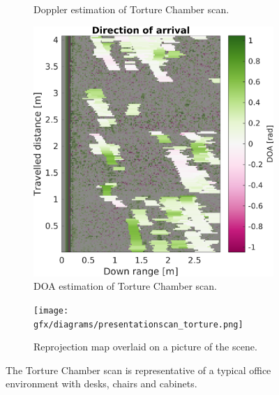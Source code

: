 \begin{figure}[htbp]
\begin{subfigure}[t]{.32\textwidth}
        \caption{Doppler estimation of Torture Chamber scan.}
        \label{fig:pres3-d}
    \end{subfigure}%
    \hfill%
    \begin{subfigure}[t]{.32\textwidth}
        \includegraphics[max width=\linewidth]{gfx/figures/t_doa.png}
        \caption{DOA estimation of Torture Chamber scan.}
        \label{fig:pres3-doa}
    \end{subfigure}
    \bigskip
    \begin{subfigure}{\textwidth}
        \texttt{[image: gfx/diagrams/presentationscan\_torture.png]}
        \caption{Reprojection map overlaid on a picture of the scene.}
        \label{fig:pres3-r}
    \end{subfigure}
    \caption{The Torture Chamber scan is representative of a typical office environment with desks, chairs and cabinets.}
    \label{fig:pres3}
\end{figure}

